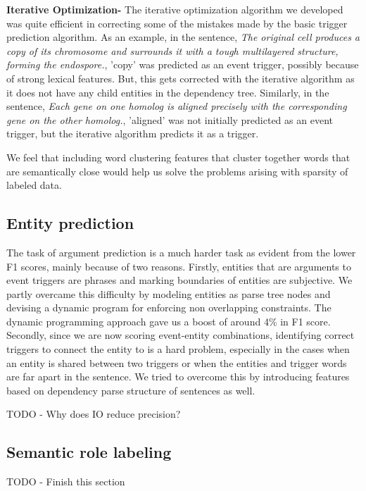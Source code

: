 {\bf Iterative Optimization-} The iterative optimization algorithm we developed was quite efficient in correcting some of the mistakes made by the basic trigger prediction algorithm. As an example, in the sentence, {\em The original cell produces a copy of its chromosome and surrounds it with a tough multilayered structure, forming the endospore.}, 'copy' was predicted as an event trigger, possibly because of strong lexical features. But, this gets corrected with the iterative algorithm as it does not have any child entities in the dependency tree. Similarly, in the sentence, {\em Each gene on one homolog is aligned precisely with the corresponding gene on the other homolog.}, 'aligned' was not initially predicted as an event trigger, but the iterative algorithm predicts it as a trigger.

We feel that including word clustering features that cluster together words that are semantically close would help us solve the problems arising with sparsity of labeled data.

\subsection{Entity prediction}
The task of argument prediction is a much harder task as evident from the lower F1 scores, mainly because of two reasons. Firstly, entities that are arguments to event triggers are phrases and marking boundaries of entities are subjective. We partly overcame this difficulty by modeling entities as parse tree nodes and devising a dynamic program for enforcing non overlapping constraints. The dynamic programming approach gave us a boost of around 4\% in F1 score. Secondly, since we are now scoring event-entity combinations, identifying correct triggers to connect the entity to is a hard problem, especially in the cases when an entity is shared between two triggers or when the entities and trigger words are far apart in the sentence. We tried to overcome this by introducing features based on dependency parse structure of sentences as well.

TODO - Why does IO reduce precision?

\subsection{Semantic role labeling}

TODO - Finish this section